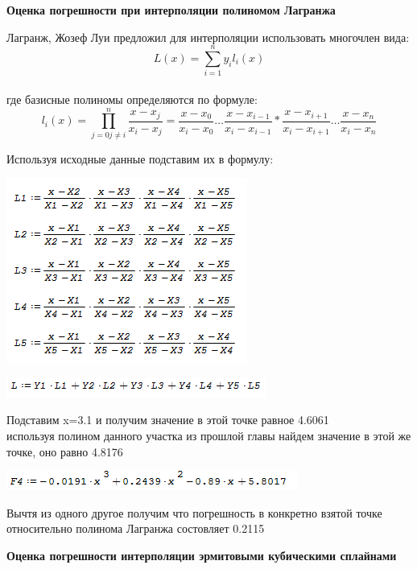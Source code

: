 \documentclass[russian,utf8,nocolumnxxxi,nocolumnxxxii]{eskdtext}
\begin{document}
{\begin{center}
{\bf Оценка погрешности при интерполяции полиномом
Лагранжа}

\end{center}

Лагранж, Жозеф Луи предложил для интерполяции использовать многочлен
вида:
$$L(x)=\sum\limits_{i=1}^ny_il_i(x)$$
\\где базисные полиномы определяются по формуле:
$$l_i(x)=\prod\limits_{j = 0 j \neq i}^n \frac{x-x_j}{x_i-x_j}=\frac{x-x_0}{x_i-x_0}\ldots \frac{x-x_{i-1}}{x_i-x_{i-1}}*\frac{x-x_{i+1}}{x_i-x_{i+1}}\ldots \frac{x-x_{n}}{x_i-x_{n}}$$


Используя исходные данные подставим их в формулу:
\begin{center}
\includegraphics[scale=0.7]{2019-01-11_01-38-55}
\end{center}

\begin{center}
\includegraphics[scale=0.7]{2019-01-11_01-39-59}
\end{center}
Подставим x=3.1 и получим значение в этой точке равное 4.6061
\\используя полином данного участка из прошлой главы найдем значение в этой же точке, оно равно 4.8176

\begin{center}
\includegraphics[scale=0.7]{2019-01-11_01-41-56}
\end{center}
Вычтя из одного другое получим что погрешность в конкретно взятой точке относительно полинома Лагранжа состовляет 0.2115
\newpage
\begin{center}

{\bf Оценка погрешности интерполяции эрмитовыми
кубическими сплайнами}


\end{center}}
\end{document}
